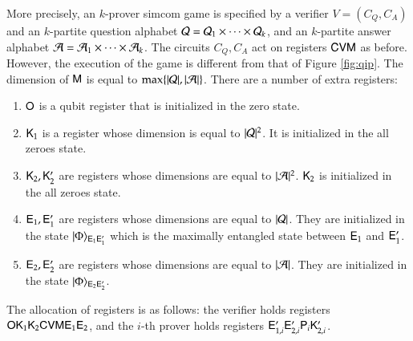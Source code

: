 More precisely, an $k$-prover simcom game is specified by a verifier $V = (C_Q,C_A)$ and an $k$-partite question alphabet $\mathcal Q = \mathcal Q_1 \times \cdots \times \mathcal Q_k$, and an $k$-partite answer alphabet $\mathcal A = \mathcal A_1 \times \cdots \times \mathcal A_k$. The circuits $C_Q, C_A$ act on registers ${\mathsf{C}} {\mathsf{V}} {\mathsf{M}}$ as before. However, the execution of the game is different from that of Figure \ref{fig:qip}. The dimension of ${\mathsf{M}}$ is equal to $\max\{ |\mathcal Q|, |\mathcal A| \}$. There are a number of extra registers:
\begin{enumerate}
	\item ${\mathsf{O}}$ is a qubit register that is initialized in the zero state.
	\item ${\mathsf{K}}_1$ is a register whose dimension is equal to $|\mathcal Q|^2$. It is initialized in the all zeroes state.
	\item ${\mathsf{K}}_2,{\mathsf{K}}_2'$ are registers whose dimensions are equal to $|\mathcal A|^2$. ${\mathsf{K}}_2$ is initialized in the all zeroes state.
	\item ${\mathsf{E}}_1,{\mathsf{E}}_1'$ are registers whose dimensions are equal to $|\mathcal Q|$. They are initialized in the state $|\Phi\rangle_{{\mathsf{E}}_{1} {\mathsf{E}}_{1}'}$ which is the maximally entangled state between ${\mathsf{E}}_1$ and ${\mathsf{E}}_1'$.
	\item ${\mathsf{E}}_2,{\mathsf{E}}_2'$ are registers whose dimensions are equal to $|\mathcal A|$. They are initialized in the state $|\Phi\rangle_{{\mathsf{E}}_{2} {\mathsf{E}}_{2}'}$.	
\end{enumerate}
The allocation of registers is as follows: the verifier holds registers ${\mathsf{O}} {\mathsf{K}}_1 {\mathsf{K}}_2 {\mathsf{C}} {\mathsf{V}} {\mathsf{M}} {\mathsf{E}}_1 {\mathsf{E}}_2$, and the $i$-th prover holds registers ${\mathsf{E}}_{1,i}' {\mathsf{E}}_{2,i}' {\mathsf{P}}_i {\mathsf{K}}_{2,i}'$. 

